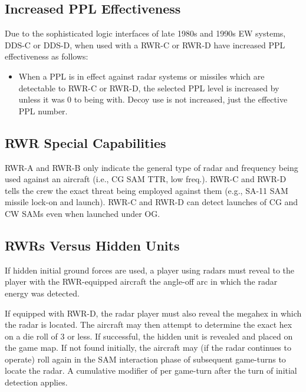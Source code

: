 \begin{advancedrules}
    \subsection{Increased PPL Effectiveness} Due to the sophisticated logic interfaces of late 1980s and 1990s EW systems, DDS-C or DDS-D, when used with a RWR-C or RWR-D have increased PPL effectiveness as follows:

    \begin{itemize}
        \item When a PPL is in effect against radar systems or missiles which are detectable to RWR-C or RWR-D, the selected PPL level is increased by  unless it was 0 to being with. Decoy use is not increased, just the effective PPL number.
    \end{itemize}

    \subsection{RWR Special Capabilities} RWR-A and RWR-B only indicate the general type of radar and frequency being used against an aircraft (i.e., CG SAM TTR, low freq.). RWR-C and RWR-D tells the crew the exact threat being employed against them (e.g., SA-11 SAM missile lock-on and launch). RWR-C and RWR-D can detect launches of CG and CW SAMs even when launched under OG.

    \subsection{RWRs Versus Hidden Units} If hidden initial ground forces are used, a player using radars must reveal to the player with the RWR-equipped aircraft the angle-off arc in which the radar energy was detected.

    If equipped with RWR-D, the radar player must also reveal the megahex in which the radar is located. The aircraft may then attempt to determine the exact hex on a die roll of 3 or less. If successful, the hidden unit is revealed and placed on the game map. If not found initially, the aircraft may (if the radar continues to operate) roll again in the SAM interaction phase of subsequent game-turns to locate the radar. A cumulative modifier of  per game-turn after the turn of initial detection applies.

\end{advancedrules}
